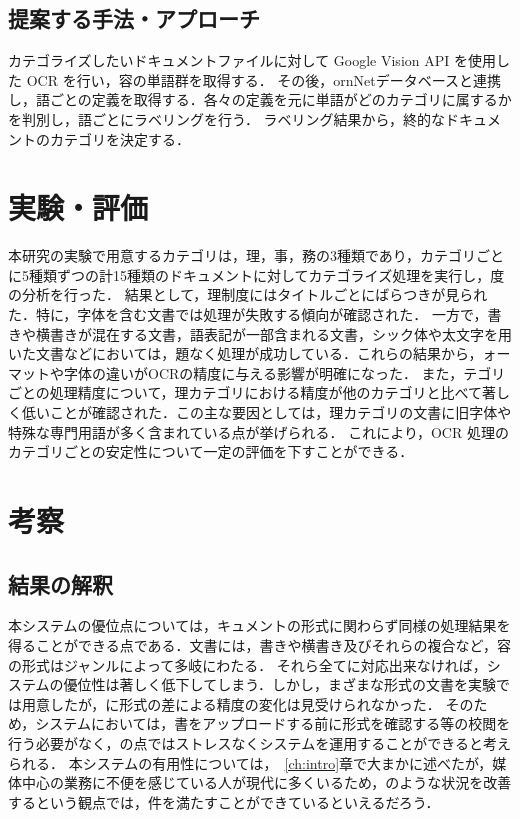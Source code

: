 \documentclass[a4j, 10pt, twocolumn]{ujarticle}
\begin{document}
\subsection{提案する手法・アプローチ}

カテゴライズしたいドキュメントファイルに対して Google Vision API を使用した OCR を行い，容の単語群を取得する．
その後，ornNetデータベースと連携し，語ごとの定義を取得する．各々の定義を元に単語がどのカテゴリに属するかを判別し，語ごとにラベリングを行う．
ラベリング結果から，終的なドキュメントのカテゴリを決定する．

\section{実験・評価}

本研究の実験で用意するカテゴリは，理，事，務の3種類であり，カテゴリごとに5種類ずつの計15種類のドキュメントに対してカテゴライズ処理を実行し，度の分析を行った．
結果として，理制度にはタイトルごとにばらつきが見られた．特に，字体を含む文書では処理が失敗する傾向が確認された．
一方で，書きや横書きが混在する文書，語表記が一部含まれる文書，シック体や太文字を用いた文書などにおいては，題なく処理が成功している．これらの結果から，ォーマットや字体の違いがOCRの精度に与える影響が明確になった．
また，テゴリごとの処理精度について，理カテゴリにおける精度が他のカテゴリと比べて著しく低いことが確認された．この主な要因としては，理カテゴリの文書に旧字体や特殊な専門用語が多く含まれている点が挙げられる．
これにより，OCR 処理のカテゴリごとの安定性について一定の評価を下すことができる．

\section{考察}
\subsection{結果の解釈}

本システムの優位点については，キュメントの形式に関わらず同様の処理結果を得ることができる点である．文書には，書きや横書き及びそれらの複合など，容の形式はジャンルによって多岐にわたる．
それら全てに対応出来なければ，システムの優位性は著しく低下してしまう．しかし，まざまな形式の文書を実験では用意したが，に形式の差による精度の変化は見受けられなかった．
そのため，システムにおいては，書をアップロードする前に形式を確認する等の校閲を行う必要がなく，の点ではストレスなくシステムを運用することができると考えられる．
本システムの有用性については，~\ref{ch:intro}章で大まかに述べたが，媒体中心の業務に不便を感じている人が現代に多くいるため，のような状況を改善するという観点では，件を満たすことができているといえるだろう．
\end{document}

